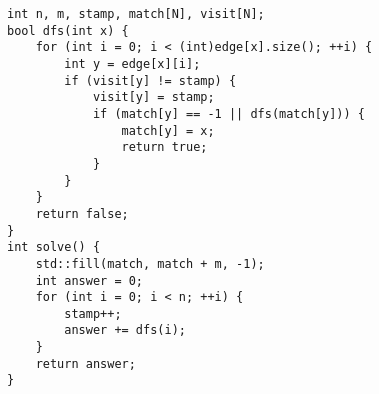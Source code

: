 \begin{lstlisting}
int n, m, stamp, match[N], visit[N];
bool dfs(int x) {
    for (int i = 0; i < (int)edge[x].size(); ++i) {
        int y = edge[x][i];
        if (visit[y] != stamp) {
            visit[y] = stamp;
            if (match[y] == -1 || dfs(match[y])) {
                match[y] = x;
                return true;
            }
        }
    }
    return false;
}
int solve() {
    std::fill(match, match + m, -1);
    int answer = 0;
    for (int i = 0; i < n; ++i) {
        stamp++;
        answer += dfs(i);
    }
    return answer;
}
\end{lstlisting}
